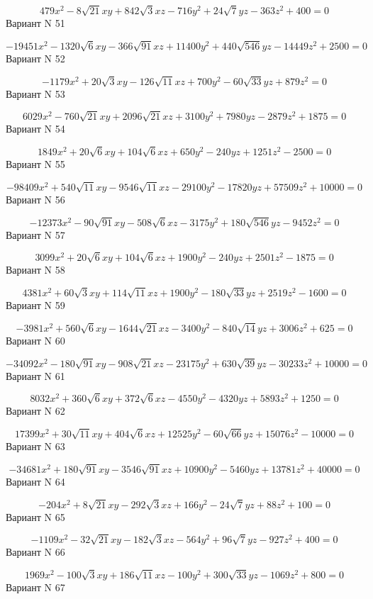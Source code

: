 \documentclass[11pt]{report}
\begin{document}
$$479 x^{2} - 8 \sqrt{21} x y + 842 \sqrt{3} x z - 716 y^{2} + 24 \sqrt{7} y z - 363 z^{2} + 400 = 0$$Вариант N 51

$$- 19451 x^{2} - 1320 \sqrt{6} x y - 366 \sqrt{91} x z + 11400 y^{2} + 440 \sqrt{546} y z - 14449 z^{2} + 2500 = 0$$Вариант N 52

$$- 1179 x^{2} + 20 \sqrt{3} x y - 126 \sqrt{11} x z + 700 y^{2} - 60 \sqrt{33} y z + 879 z^{2} = 0$$Вариант N 53

$$6029 x^{2} - 760 \sqrt{21} x y + 2096 \sqrt{21} x z + 3100 y^{2} + 7980 y z - 2879 z^{2} + 1875 = 0$$Вариант N 54

$$1849 x^{2} + 20 \sqrt{6} x y + 104 \sqrt{6} x z + 650 y^{2} - 240 y z + 1251 z^{2} - 2500 = 0$$Вариант N 55

$$- 98409 x^{2} + 540 \sqrt{11} x y - 9546 \sqrt{11} x z - 29100 y^{2} - 17820 y z + 57509 z^{2} + 10000 = 0$$Вариант N 56

$$- 12373 x^{2} - 90 \sqrt{91} x y - 508 \sqrt{6} x z - 3175 y^{2} + 180 \sqrt{546} y z - 9452 z^{2} = 0$$Вариант N 57

$$3099 x^{2} + 20 \sqrt{6} x y + 104 \sqrt{6} x z + 1900 y^{2} - 240 y z + 2501 z^{2} - 1875 = 0$$Вариант N 58

$$4381 x^{2} + 60 \sqrt{3} x y + 114 \sqrt{11} x z + 1900 y^{2} - 180 \sqrt{33} y z + 2519 z^{2} - 1600 = 0$$Вариант N 59

$$- 3981 x^{2} + 560 \sqrt{6} x y - 1644 \sqrt{21} x z - 3400 y^{2} - 840 \sqrt{14} y z + 3006 z^{2} + 625 = 0$$Вариант N 60

$$- 34092 x^{2} - 180 \sqrt{91} x y - 908 \sqrt{21} x z - 23175 y^{2} + 630 \sqrt{39} y z - 30233 z^{2} + 10000 = 0$$Вариант N 61

$$8032 x^{2} + 360 \sqrt{6} x y + 372 \sqrt{6} x z - 4550 y^{2} - 4320 y z + 5893 z^{2} + 1250 = 0$$Вариант N 62

$$17399 x^{2} + 30 \sqrt{11} x y + 404 \sqrt{6} x z + 12525 y^{2} - 60 \sqrt{66} y z + 15076 z^{2} - 10000 = 0$$Вариант N 63

$$- 34681 x^{2} + 180 \sqrt{91} x y - 3546 \sqrt{91} x z + 10900 y^{2} - 5460 y z + 13781 z^{2} + 40000 = 0$$Вариант N 64

$$- 204 x^{2} + 8 \sqrt{21} x y - 292 \sqrt{3} x z + 166 y^{2} - 24 \sqrt{7} y z + 88 z^{2} + 100 = 0$$Вариант N 65

$$- 1109 x^{2} - 32 \sqrt{21} x y - 182 \sqrt{3} x z - 564 y^{2} + 96 \sqrt{7} y z - 927 z^{2} + 400 = 0$$Вариант N 66

$$1969 x^{2} - 100 \sqrt{3} x y + 186 \sqrt{11} x z - 100 y^{2} + 300 \sqrt{33} y z - 1069 z^{2} + 800 = 0$$Вариант N 67
\end{document}
